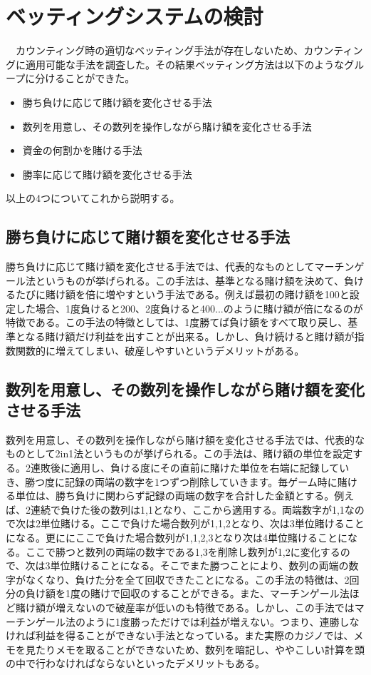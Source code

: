 \section{ベッティングシステムの検討}
　カウンティング時の適切なベッティング手法が存在しないため、カウンティングに適用可能な手法を調査した。その結果ベッティング方法は以下のようなグループに分けることができた。
\begin{itemize}
\item 勝ち負けに応じて賭け額を変化させる手法
\item 数列を用意し、その数列を操作しながら賭け額を変化させる手法
\item 資金の何割かを賭ける手法
\item 勝率に応じて賭け額を変化させる手法
\end{itemize}
以上の4つについてこれから説明する。

\subsection{勝ち負けに応じて賭け額を変化させる手法}
勝ち負けに応じて賭け額を変化させる手法では、代表的なものとしてマーチンゲール法というものが挙げられる。この手法は、基準となる賭け額を決めて、負けるたびに賭け額を倍に増やすという手法である。例えば最初の賭け額を100と設定した場合、1度負けると200、2度負けると400...のように賭け額が倍になるのが特徴である。この手法の特徴としては、1度勝てば負け額をすべて取り戻し、基準となる賭け額だけ利益を出すことが出来る。しかし、負け続けると賭け額が指数関数的に増えてしまい、破産しやすいというデメリットがある。

\subsection{数列を用意し、その数列を操作しながら賭け額を変化させる手法}
 数列を用意し、その数列を操作しながら賭け額を変化させる手法では、代表的なものとして2in1法というものが挙げられる。この手法は、賭け額の単位を設定する。2連敗後に適用し、負ける度にその直前に賭けた単位を右端に記録していき、勝つ度に記録の両端の数字を1つずつ削除していきます。毎ゲーム時に賭ける単位は、勝ち負けに関わらず記録の両端の数字を合計した金額とする。例えば、2連続で負けた後の数列は{1,1}となり、ここから適用する。両端数字が1,1なので次は2単位賭ける。ここで負けた場合数列が{1,1,2}となり、次は3単位賭けることになる。更ににここで負けた場合数列が{1,1,2,3}となり次は4単位賭けることになる。ここで勝つと数列の両端の数字である1,3を削除し数列が{1,2}に変化するので、次は3単位賭けることになる。そこでまた勝つことにより、数列の両端の数字がなくなり、負けた分を全て回収できたことになる。この手法の特徴は、2回分の負け額を1度の賭けで回収のすることができる。また、マーチンゲール法ほど賭け額が増えないので破産率が低いのも特徴である。しかし、この手法ではマーチンゲール法のように1度勝っただけでは利益が増えない。つまり、連勝しなければ利益を得ることができない手法となっている。また実際のカジノでは、メモを見たりメモを取ることができないため、数列を暗記し、ややこしい計算を頭の中で行わなければならないといったデメリットもある。

